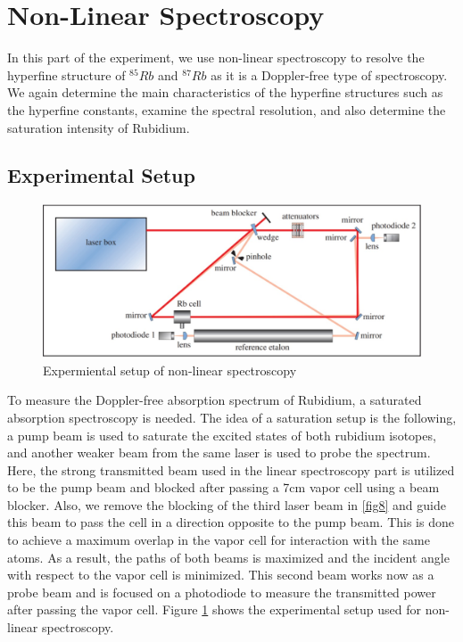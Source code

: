 \documentclass[12pt]{article}
\begin{document}
\section{Non-Linear Spectroscopy}

In this part of the experiment, we use non-linear spectroscopy to resolve the hyperfine structure of $^{85}Rb$ and $^{87}Rb$ as it is a Doppler-free type of spectroscopy. We again determine the main characteristics of the hyperfine structures such as the hyperfine constants, examine the spectral resolution, and also determine the saturation intensity of Rubidium.


\subsection{Experimental Setup}

\begin{figure}[H]
    \centering
    \includegraphics[width = \textwidth]{fig/setup4.jpg}
    \caption{Expermiental setup of non-linear spectroscopy \cite{lecturenote}}
    \label{fig12}
\end{figure}

To measure the Doppler-free absorption spectrum of Rubidium, a saturated absorption spectroscopy is needed. The idea of a saturation setup is the following, a pump beam 
is used to saturate the excited states of both rubidium isotopes, and another weaker beam from the same laser is used to probe the spectrum. Here, the strong transmitted beam used in the linear spectroscopy part is utilized to be the pump beam and blocked after passing a 7cm vapor cell using a beam blocker. Also, we remove the blocking of the third laser beam in \ref{fig8} and guide this beam to pass the cell in a direction opposite to the pump beam. This is done to achieve a maximum overlap in the vapor cell for interaction with the same atoms. As a result, the paths of both beams is maximized and the incident angle with respect to the vapor cell is minimized. This second beam works now as a probe beam and is focused on a photodiode to measure the transmitted power after passing the vapor cell. Figure \ref{fig12} shows the experimental setup used for non-linear spectroscopy. 
\end{document}
